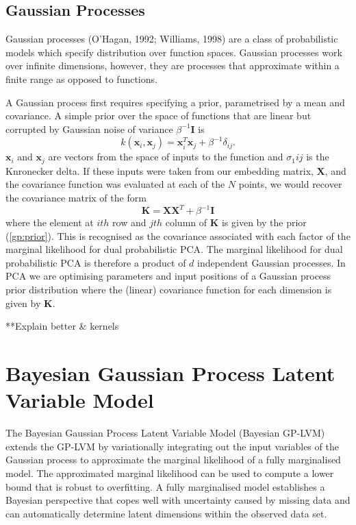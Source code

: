 \documentclass[ %
                    author={Dillon Keith Diep [INCOMPLETE DRAFT, NOT FOR SUBMISSION]},
                supervisor={Dr. Carl Henrik Ek},
                    degree={MEng},
                     title={ARt-CG:},
                  subtitle={Assisted Real-time Content Generation of 3D Hair by Learning Manifolds},
                      type={Research},
                      year={2014} ]{dissertation}
\begin{document}
\subsection{Gaussian Processes}
{\color{red}
Gaussian processes (O'Hagan, 1992; Williams, 1998) are a class of probabilistic models which specify distribution over function spaces.
Gaussian processes work over infinite dimensions, however, they are processes that approximate within a finite range as opposed to functions.

A Gaussian process first requires specifying a prior, parametrised by a mean and covariance.
A simple prior over the space of functions that are linear but corrupted by Gaussian noise of variance $\beta^{-1}\mathbf{I}$ is
\begin{equation} \label{gp:prior}
	k(\mathbf{x}_i,\mathbf{x}_j)=\mathbf{x}^T_i\mathbf{x}_j+\beta^{-1}\delta_{ij}.
\end{equation}
$\mathbf{x}_i$ and $\mathbf{x}_j$ are vectors from the space of inputs to the function and $\sigma_1{ij}$ is the Knronecker delta. If these inputs were taken from our embedding matrix, $\mathbf{X}$, and the covariance function was evaluated at each of the $N$ points, we would recover the covariance matrix of the form
$$\mathbf{K=XX}^T+\beta^{-1}\mathbf{I}$$
where the element at $ith$ row and $jth$ column of $\mathbf{K}$ is given by the prior (\ref{gp:prior}). This is recognised as the covariance associated with each factor of the marginal likelihood for dual probabilistic PCA. The marginal likelihood for dual probabilistic PCA is therefore a product of $d$ independent Gaussian processes. In PCA we are optimising parameters and input positions of a Gaussian process prior distribution where the (linear) covariance function for each dimension is given by $\mathbf{K}$.

**Explain better \& kernels
}



\section{Bayesian Gaussian Process Latent Variable Model}
The Bayesian Gaussian Process Latent Variable Model (Bayesian GP-LVM) \cite{bgplvm} extends the GP-LVM by variationally integrating out the input variables of the Gaussian process to approximate the marginal likelihood of a fully marginalised model. The approximated marginal likelihood can be used to compute a lower bound that is robust to overfitting. A fully marginalised model establishes a Bayesian perspective that copes well with uncertainty caused by missing data and can automatically determine latent dimensions within the observed data set.
\end{document}
